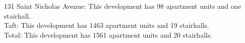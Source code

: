 {131 Saint Nicholas Avenue}: This development has 98 apartment units and one stairhall.\\{Taft}: This development has 1463 apartment units and 19 stairhalls.\\{Total}: This development has 1561 apartment units and 20 stairhalls.\\